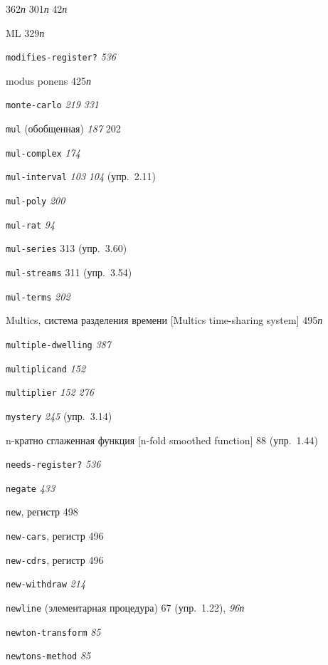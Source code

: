 \begin{theindex}
   362{\it п}
   301{\it п}
   42{\it п}
\item {ML} 329{\it п}
\item {\texttt{modifies-register?}} {\it 536}
\item {modus ponens} 425{\it п}
\item {\texttt{monte-carlo}} {\it 219}
   {\it 331}
\item {\texttt{mul} (обобщенная)} {\it 187}
   202
\item {\texttt{mul-complex}} {\it 174}
\item {\texttt{mul-interval}} {\it 103}
   {\it 104} (упр.~2.11)
\item {\texttt{mul-poly}} {\it 200}
\item {\texttt{mul-rat}} {\it 94}
\item {\texttt{mul-series}} 313 (упр.~3.60)
\item {\texttt{mul-streams}} 311 (упр.~3.54)
\item {\texttt{mul-terms}} {\it 202}
\item {Multics, система разделения времени [Multics time-sharing system]} 495{\it п}
\item {\texttt{multiple-dwelling}} {\it 387}
\item {\texttt{multiplicand}} {\it 152}
\item {\texttt{multiplier}}
   {\it 152}
   {\it 276}
\item {\texttt{mystery}} {\it 245} (упр.~3.14)
\bigskip
\item {n-кратно сглаженная функция [n-fold smoothed function]} 88 (упр.~1.44)
\item {\texttt{needs-register?}} {\it 536}
\item {\texttt{negate}} {\it 433}
\item {\texttt{new}, регистр} 498
\item {\texttt{new-cars}, регистр} 496
\item {\texttt{new-cdrs}, регистр} 496
\item {\texttt{new-withdraw}} {\it 214}
\item {\texttt{newline} (элементарная процедура)} 67 (упр.~1.22), {\it 96}{\it п}
\item {\texttt{newton-transform}} {\it 85}
\item {\texttt{newtons-method}} {\it 85}

\end{theindex}
